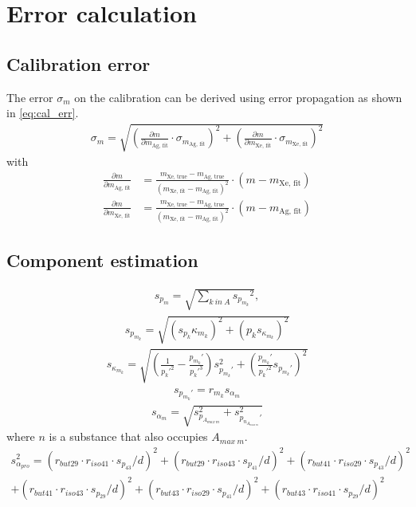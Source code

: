\section{Error calculation}
\label{app:err}
\subsection{Calibration error}
\label{app:err_cal}
The error $\sigma_{m}$ on the calibration can be derived using error propagation as shown in \eqref{eq:cal_err}.
\begin{align}
    \sigma_m = \sqrt{ \left(\frac{\partial m}{\partial m_\text{Ag, fit}}\cdot \sigma_{m_\text{Ag, fit}}\right)^2 + \left(\frac{\partial m}{\partial m_\text{Xe, fit}}\cdot \sigma_{m_\text{Xe, fit}}\right)^2}
    \label{eq:cal_err}
\end{align}
with
\begin{align}
     \frac{\partial m}{\partial m_\text{Ag, fit}} &= \frac{m_\text{Xe, true} - m_\text{Ag, true}}{(m_\text{Xe, fit} - m_\text{Ag, fit})^2} \cdot (m-m_\text{Xe, fit}) \\
    \frac{\partial m}{\partial m_\text{Xe, fit}} &= \frac{m_\text{Xe, true} - m_\text{Ag, true}}{(m_\text{Xe, fit} - m_\text{Ag, fit})^2} \cdot (m-m_\text{Ag, fit})
\end{align}

\subsection{Component estimation}


\begin{align}
    s_{p_m} =\sqrt{ \sum_{k~in~A} {s_{p_{m_k}}}^2}, 
\end{align}
\begin{align}
    {s_{p_{m_k}}} = \sqrt{({s_{p_k}} \kappa_{m_k})^2 + ({p_k} s_{\kappa_{m_k}})^2}
\end{align}
\begin{align}
    s_{\kappa_{m_k}} = \sqrt{(\frac{1}{p_k'^2}- \frac{p_{m_k}'}{p_k'^3})s_{p_{m_k}'}^2 +  (\frac{p_{m_k}'}{p_k'^2} s_{p_{m_k}'})^2}
\end{align}
\begin{align}
    s_{p_{m_k}'} = r_{m_k} s_{\alpha_m}
\end{align}
\begin{align}
    s_{\alpha_m} = \sqrt{s_{p_{A_{max~m}}}^2 + s_{p_{n_{A_{max~m}}}'}^2}
\end{align}
where $n$ is a substance that also occupies $A_{max~m}$. 
\begin{align}
     s_{\alpha_{pro}}^2= (r_{but29} \cdot r_{iso41} \cdot s_{p_{43}} / d)^2 +  (r_{but29} \cdot r_{iso43} \cdot s_{p_{41}} / d)^2 + ( r_{but41} \cdot r_{iso29} \cdot s_{p_{43}}/d)^2 \\ \nonumber
     + ( r_{but41} \cdot r_{iso43} \cdot s_{p_{29}}/d)^2 +  (r_{but43} \cdot r_{iso29} \cdot s_{p_{41}}/d)^2 + (r_{but43} \cdot r_{iso41} \cdot  s_{p_{29}}/d)^2
\end{align}


